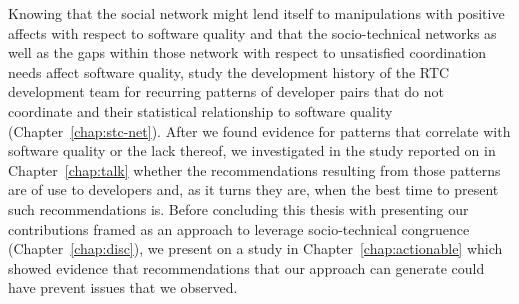 Knowing that the social network might lend itself to manipulations with positive affects with respect to software quality and that the socio-technical networks as well as the gaps within those network with respect to unsatisfied coordination needs affect software quality, study the development history of the RTC development team for recurring patterns of developer pairs that do not coordinate and their statistical relationship to software quality (Chapter~\ref{chap:stc-net}).
After we found evidence for patterns that correlate with software quality or the lack thereof, we investigated in the study reported on in Chapter~\ref{chap:talk} whether the recommendations resulting from those patterns are of use to developers and, as it turns they are, when the best time to present such recommendations is.
Before concluding this thesis with presenting our contributions framed as an approach to leverage socio-technical congruence (Chapter~\ref{chap:disc}), we present on a study in Chapter~\ref{chap:actionable} which showed evidence that 
recommendations that our approach can generate could have prevent issues that we observed.



























